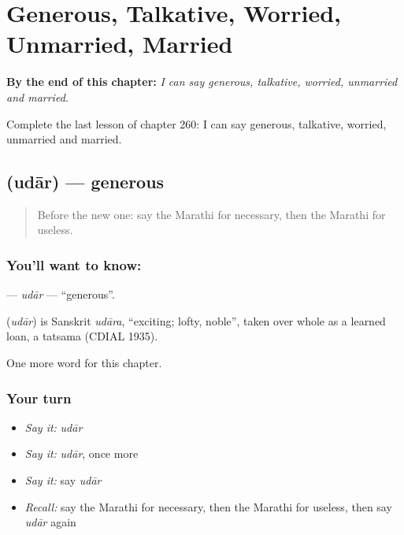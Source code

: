 
\chapter{Generous, Talkative, Worried, Unmarried, Married}
\label{ch:mr-generous-talkative-worried-unmarried-married}

\begin{chapteropening}
\textbf{By the end of this chapter:} \emph{I can say generous, talkative, worried, unmarried and married.}

Complete the last lesson of chapter 260: I can say generous, talkative, worried, unmarried and married.
\end{chapteropening}

\section[\texorpdfstring{\mr{उदार} (udār)}{उदार (udār)}]{ (udār) — generous}

\label{lesson:MR-C260-udar}



\begin{quote}
Before the new one: say the Marathi for necessary, then the Marathi for useless.
\end{quote}

\subsection*{You'll want to know: }
\textbf{} — \emph{udār} — \textquotedblleft{}generous\textquotedblright{}.

\begin{cousinweb}
\textbf{} (\emph{udār}) is Sanskrit \emph{udāra}, \textquotedblleft{}exciting; lofty, noble\textquotedblright{}, taken over whole as a learned loan, a tatsama (CDIAL 1935).
\end{cousinweb}

\begin{grammarlens}[title={What you've built}]
One more word for this chapter.
\end{grammarlens}

\subsection*{Your turn}
\begin{itemize}
\raggedright
  \item \emph{Say it:} \emph{udār}
  \item \emph{Say it:} \emph{udār}, once more
  \item \emph{Say it:} say \emph{udār}
  \item \emph{Recall:} say the Marathi for necessary, then the Marathi for useless, then say \emph{udār} again
\end{itemize}

